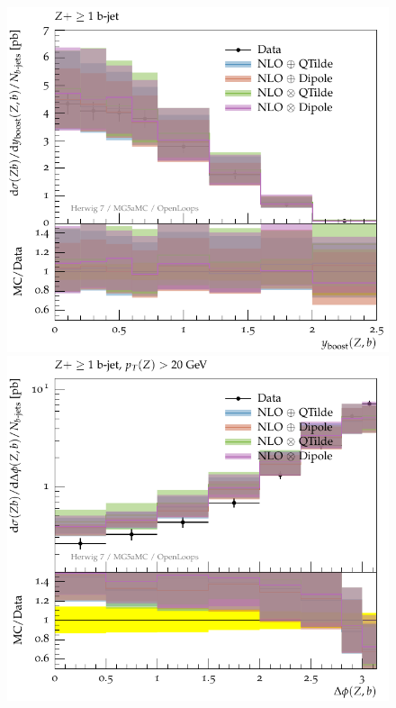 \documentclass[11pt]{cernrep}
\begin{document}
\begin{figure}[htbp]
\begin{center}
   \includegraphics[scale=0.65]{figs/zbb/herwigzbb/atlas-d07-x01-y01.pdf} 
   \includegraphics[scale=0.65]{figs/zbb/herwigzbb/atlas-d11-x01-y01.pdf} \\

\end{center}
\end{figure}
\end{document}
